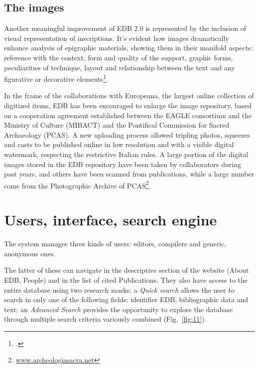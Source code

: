 \documentclass[amsthm,ebook]{saparticle}
\begin{document}
\subsection{The images}


Another meaningful improvement of EDB 2.0 is represented by the inclusion of visual representation of inscriptions. It’s
evident how images dramatically enhance analysis of epigraphic materials, showing them in their manifold aspects:
reference with the context, form and quality of the support, graphic forms, peculiarities of technique, layout and
relationship between the text and any figurative or decorative elements\footnote{\citet{panciera_questioni_2006}.}.

In the frame of the collaborations with Europeana, the largest online collection of digitized items, EDB has been
encouraged to enlarge the image repository, based on a cooperation agreement established between the EAGLE consortium
and the Ministry of Culture (MIBACT) and the Pontifical Commission for Sacred Archaeology (PCAS). A new uploading
process allowed tripling photos, squeezes and casts to be published online in low resolution and with a visible digital
watermark, respecting the restrictive Italian rules. A large portion of the digital images stored in the EDB repository
have been taken by collaborators during past years, and others have been scanned from publications, while a large
number come from the Photographic Archive of PCAS\footnote{ \url{www.archeologiasacra.net}}.




\section{Users, interface, search engine}





The system manages three kinds of users: editors, compilers and generic, anonymous ones.

The latter of these can navigate in the descriptive section of the website (About EDB, People) and in the list of cited
Publications. They also have access to the entire database using two research masks: a \emph{Quick search} allows the user to
search in only one of the following fields: identifier EDB, bibliographic data and text; an \emph{Advanced Search} provides
the opportunity to explore the database through multiple search criteria variously combined (Fig.~\ref{fig:11}).
\end{document}
